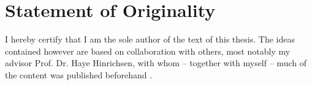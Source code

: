 \newpage

\section*{Statement of Originality}

I hereby certify that I am the sole author of the text of this thesis. The ideas contained however are based on collaboration with others, most notably my advisor Prof. Dr. Haye Hinrichsen, with whom -- together with myself -- much of the content was published beforehand \cite{thingie-paper, flow-paper}.